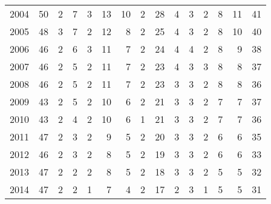 \begin{tabular}{lrrrrrrrrrrrrrr}
2004 &               50 &             2 &        7 &          3 &             13 &           10 &           2 &           28 &         4 &             3 &              2 &        8 &              11 &           41 \\
2005 &               48 &             3 &        7 &          2 &             12 &            8 &           2 &           25 &         4 &             3 &              2 &        8 &              10 &           40 \\
2006 &               46 &             2 &        6 &          3 &             11 &            7 &           2 &           24 &         4 &             4 &              2 &        8 &               9 &           38 \\
2007 &               46 &             2 &        5 &          2 &             11 &            7 &           2 &           23 &         4 &             3 &              3 &        8 &               8 &           37 \\
2008 &               46 &             2 &        5 &          2 &             11 &            7 &           2 &           23 &         3 &             3 &              2 &        8 &               8 &           36 \\
2009 &               43 &             2 &        5 &          2 &             10 &            6 &           2 &           21 &         3 &             3 &              2 &        7 &               7 &           37 \\
2010 &               43 &             2 &        4 &          2 &             10 &            6 &           1 &           21 &         3 &             3 &              2 &        7 &               7 &           36 \\
2011 &               47 &             2 &        3 &          2 &              9 &            5 &           2 &           20 &         3 &             3 &              2 &        6 &               6 &           35 \\
2012 &               46 &             2 &        3 &          2 &              8 &            5 &           2 &           19 &         3 &             3 &              2 &        6 &               6 &           33 \\
2013 &               47 &             2 &        2 &          2 &              8 &            5 &           2 &           18 &         3 &             3 &              2 &        5 &               5 &           32 \\
2014 &               47 &             2 &        2 &          1 &              7 &            4 &           2 &           17 &         2 &             3 &              1 &        5 &               5 &           31 \\

\end{tabular}
